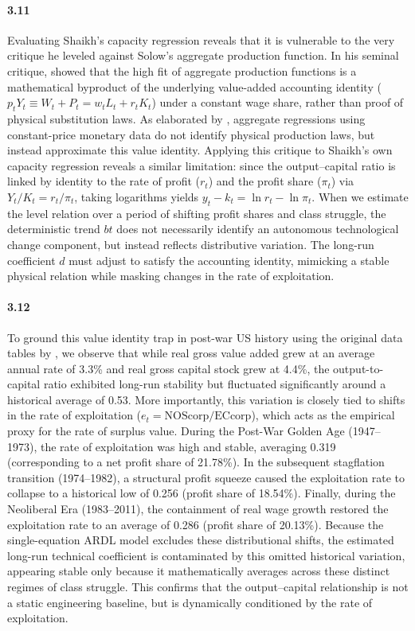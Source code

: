 \paragraph{3.11}
Evaluating Shaikh's capacity regression reveals that it is vulnerable to the very critique he leveled against Solow's aggregate production function. In his seminal critique, \citet{Shaikh1974} showed that the high fit of aggregate production functions is a mathematical byproduct of the underlying value-added accounting identity ($p_tY_t \equiv W_t + P_t = w_t L_t + r_t K_t$) under a constant wage share, rather than proof of physical substitution laws. As elaborated by \citet{Felipe2005}, aggregate regressions using constant-price monetary data do not identify physical production laws, but instead approximate this value identity. Applying this critique to Shaikh's own capacity regression reveals a similar limitation: since the output--capital ratio is linked by identity to the rate of profit ($r_t$) and the profit share ($\pi_t$) via $Y_t/K_t = r_t/\pi_t$, taking logarithms yields $y_t - k_t = \ln r_t - \ln \pi_t$. When we estimate the level relation over a period of shifting profit shares and class struggle, the deterministic trend $bt$  does not necessarily identify an autonomous technological change component, but instead reflects distributive variation. The long-run coefficient $d$ must adjust to satisfy the accounting identity, mimicking a stable physical relation while masking changes in the rate of exploitation.

\paragraph{3.12}
To ground this value identity trap in post-war US history using the original data tables by \citet{Shaikh2016}, we observe that while real gross value added grew at an average annual rate of 3.3\% and real gross capital stock grew at 4.4\%, the output-to-capital ratio exhibited long-run stability but fluctuated significantly around a historical average of 0.53. More importantly, this variation is closely tied to shifts in the rate of exploitation ($e_t = \text{NOScorp}/\text{ECcorp}$), which acts as the empirical proxy for the rate of surplus value. During the Post-War Golden Age (1947–1973), the rate of exploitation was high and stable, averaging 0.319 (corresponding to a net profit share of 21.78\%). In the subsequent stagflation transition (1974–1982), a structural profit squeeze caused the exploitation rate to collapse to a historical low of 0.256 (profit share of 18.54\%). Finally, during the Neoliberal Era (1983–2011), the containment of real wage growth restored the exploitation rate to an average of 0.286 (profit share of 20.13\%). Because the single-equation ARDL model excludes these distributional shifts, the estimated long-run technical coefficient is contaminated by this omitted historical variation, appearing stable only because it mathematically averages across these distinct regimes of class struggle. This confirms that the output--capital relationship is not a static engineering baseline, but is dynamically conditioned by the rate of exploitation.

